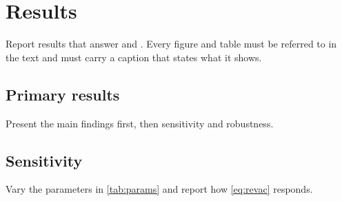 \chapter{Results}
\label{ch:results}

Report results that answer \rqone{} and \rqtwo{}. Every figure and table
must be referred to in the text and must carry a caption that states what
it shows.

\section{Primary results}

Present the main findings first, then sensitivity and robustness.

\section{Sensitivity}

Vary the parameters in \cref{tab:params} and report how \cref{eq:revac}
responds.
